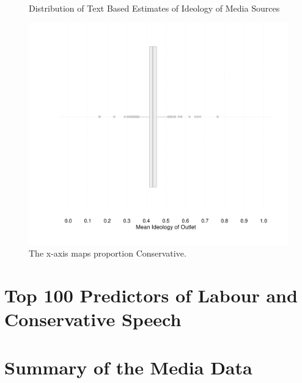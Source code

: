 \documentclass[12pt, letterpaper]{article}
\begin{document}
\label{full_dist}
\begin{figure}[h]
\centering
\caption{Distribution of Text Based Estimates of Ideology of Media Sources}
\includegraphics[scale=1]{../figs/hist_text_media.pdf}
\caption*{The x-axis maps proportion Conservative.}
\label{fig:fig5}
\end{figure}

\clearpage
\section{Top 100 Predictors of Labour and Conservative Speech}
\label{si_top100}

\clearpage

\clearpage

\section{Summary of the Media Data}
\label{si_media_sum}

\end{document}
